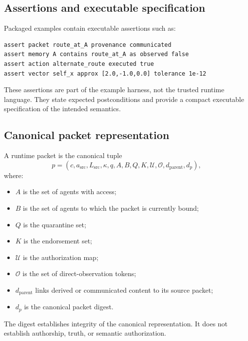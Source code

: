 \subsection{Assertions and executable specification}

Packaged examples contain executable assertions such as:
\begin{lstlisting}[style=osl]
assert packet route_at_A provenance communicated
assert memory A contains route_at_A as observed false
assert action alternate_route executed true
assert vector self_x approx [2.0,-1.0,0.0] tolerance 1e-12
\end{lstlisting}
These assertions are part of the example harness, not the trusted runtime
language.  They state expected postconditions and provide a compact executable
specification of the intended semantics.

\subsection{Canonical packet representation}

A runtime packet is the canonical tuple
\[
p=
(c,a_{\mathrm{src}},L_{\mathrm{src}},\kappa,q,
A,B,Q,K,\mathcal U,\mathcal O,d_{\mathrm{parent}},d_p),
\]
where:
\begin{itemize}[leftmargin=1.6em]
  \item \(A\) is the set of agents with access;
  \item \(B\) is the set of agents to which the packet is currently bound;
  \item \(Q\) is the quarantine set;
  \item \(K\) is the endorsement set;
  \item \(\mathcal U\) is the authorization map;
  \item \(\mathcal O\) is the set of direct-observation tokens;
  \item \(d_{\mathrm{parent}}\) links derived or communicated content to its
  source packet;
  \item \(d_p\) is the canonical packet digest.
\end{itemize}
The digest establishes integrity of the canonical representation.  It does not
establish authorship, truth, or semantic authorization.
